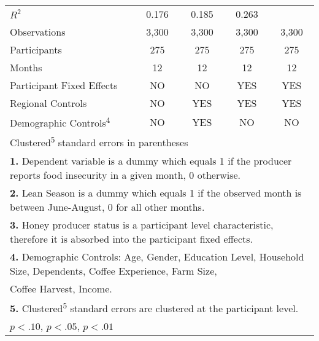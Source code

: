 \begin{table}[htbp]
\begin{tabular}{l*{4}{c}}
\midrule
\(R^{2}\)           &       0.176         &       0.185         &       0.263         &                     \\
Observations        &       3,300         &       3,300         &       3,300         &       3,300         \\
Participants        &         275         &         275         &         275         &         275         \\
Months              &          12         &          12         &          12         &          12         \\
\hline Participant Fixed Effects&          NO         &          NO         &         YES         &         YES         \\
Regional Controls   &          NO         &         YES         &         YES         &         YES         \\
Demographic Controls\textsuperscript{4}&          NO         &         YES         &          NO         &          NO         \\
\bottomrule
\multicolumn{5}{l}{\footnotesize Clustered\textsuperscript{5} standard errors in parentheses}\\
\multicolumn{5}{l}{\footnotesize \textbf{1.} Dependent variable is a dummy which equals 1 if the producer reports food insecurity in a given month, 0 otherwise.}\\
\multicolumn{5}{l}{\footnotesize \textbf{2.} Lean Season is a dummy which equals 1 if the observed month is between June-August, 0 for all other months.}\\
\multicolumn{5}{l}{\footnotesize \textbf{3.} Honey producer status is a participant level characteristic, therefore it is absorbed into the participant fixed effects.}\\
\multicolumn{5}{l}{\footnotesize \textbf{4.} Demographic Controls: Age, Gender, Education Level, Household Size, Dependents, Coffee Experience, Farm Size,}\\
\multicolumn{5}{l}{\footnotesize Coffee Harvest, Income.}\\
\multicolumn{5}{l}{\footnotesize \textbf{5.} Clustered\textsuperscript{5} standard errors are clustered at the participant level.}\\
\multicolumn{5}{l}{\footnotesize \sym{*} \(p<.10\), \sym{**} \(p<.05\), \sym{***} \(p<.01\)}\\
\end{tabular}
\end{table}
